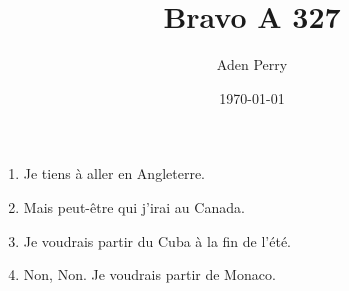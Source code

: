 \documentclass{article}
\title{Bravo A 327}
\author{Aden Perry}
\date{\today}
\begin{document}
\maketitle

\begin{enumerate}
    \item Je tiens à aller en Angleterre.
    \item Mais peut-être qui j'irai au Canada.
    \item Je voudrais partir du Cuba à la fin de l'été.
    \item Non, Non. Je voudrais partir de Monaco.
\end{enumerate}
\end{document}
